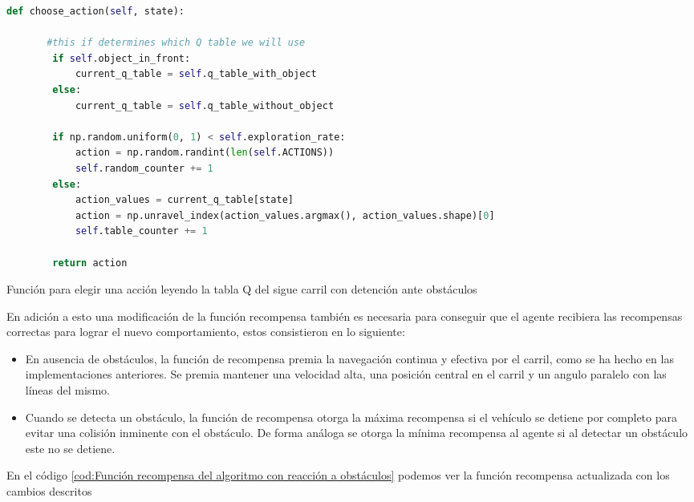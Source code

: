 \begin{code}[H]
	\begin{lstlisting}[language=Python]
    def choose_action(self, state):
	
       #this if determines which Q table we will use
        if self.object_in_front:
            current_q_table = self.q_table_with_object
        else:
            current_q_table = self.q_table_without_object
    
        if np.random.uniform(0, 1) < self.exploration_rate:
            action = np.random.randint(len(self.ACTIONS))
            self.random_counter += 1
        else:
            action_values = current_q_table[state]
            action = np.unravel_index(action_values.argmax(), action_values.shape)[0]
            self.table_counter += 1

        return action
	\end{lstlisting}
\caption[Función para elegir una acción leyendo la tabla Q del sigue carril con detención ante obstáculos]{Función para elegir una acción leyendo la tabla Q del sigue carril con detención ante obstáculos}
\label{cod:Función para elegir una acción de la tabla Q del algoritmo con reacción a obstáculos}
\end{code}

\bigskip

En adición a esto una modificación de la función recompensa también es necesaria para conseguir que el agente recibiera las recompensas correctas para lograr el nuevo comportamiento, estos consistieron en lo siguiente:

\begin{itemize}
    \item En ausencia de obstáculos, la función de recompensa premia la navegación continua y efectiva por el carril, como se ha hecho en las implementaciones anteriores. Se premia mantener una velocidad alta, una posición central en el carril y un angulo paralelo con las líneas del mismo.
    
    \item Cuando se detecta un obstáculo, la función de recompensa otorga la máxima recompensa si el vehículo se detiene por completo para evitar una colisión inminente con el obstáculo. De forma análoga se otorga la mínima recompensa al agente si al detectar un obstáculo este no se detiene.
\end{itemize}

\bigskip

En el código \ref{cod:Función recompensa del algoritmo con reacción a obstáculos} podemos ver la función recompensa actualizada con los cambios descritos

